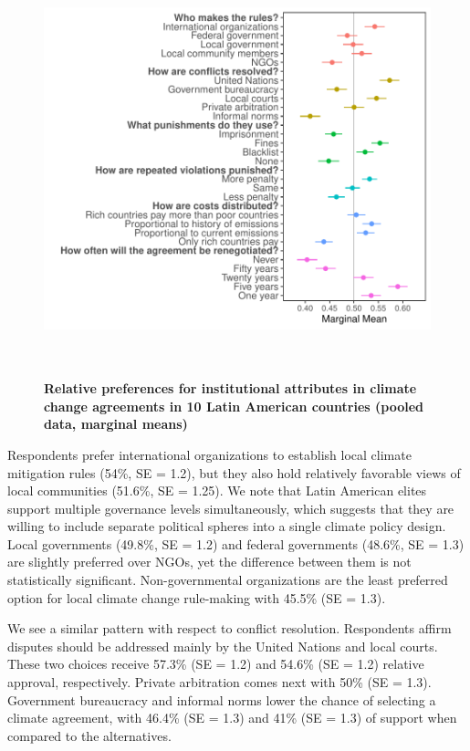\documentclass[a4paper,12pt]{article}
\begin{document}
\begin{figure}[h]
	\centering
	\includegraphics[height=12cm]{MM_all.pdf}
	\caption{\textbf{Relative preferences for institutional attributes in climate change agreements in 10 Latin American countries (pooled data, marginal means)}}
	\label{fig:pooled}
\end{figure}

Respondents prefer international organizations to establish local climate mitigation rules (54\%, SE = 1.2), but they also hold relatively favorable views of local communities (51.6\%, SE = 1.25). We note that Latin American elites support multiple governance levels simultaneously, which suggests that they are willing to include separate political spheres into a single climate policy design. Local governments (49.8\%, SE = 1.2) and federal governments (48.6\%, SE = 1.3) are slightly preferred over NGOs, yet the difference between them is not statistically significant. Non-governmental organizations are the least preferred option for local climate change rule-making with 45.5\% (SE = 1.3).

We see a similar pattern with respect to conflict resolution. Respondents affirm disputes should be addressed mainly by the United Nations and local courts. These two choices receive 57.3\% (SE = 1.2) and 54.6\% (SE = 1.2) relative approval, respectively. Private arbitration comes next with 50\% (SE = 1.3). Government bureaucracy and informal norms lower the chance of selecting a climate agreement, with 46.4\% (SE = 1.3) and 41\% (SE = 1.3) of support when compared to the alternatives.
\end{document}
